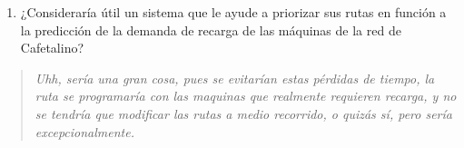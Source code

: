 \begin{enumerate}
\def\labelenumi{\arabic{enumi}.}
\setcounter{enumi}{4}
\item
  ¿Consideraría útil un sistema que le ayude a priorizar sus rutas en función a la predicción de la demanda de recarga de las máquinas de la red de Cafetalino?
\end{enumerate}

\begin{quote}
\emph{Uhh, sería una gran cosa, pues se evitarían estas pérdidas de tiempo, la ruta se programaría con las maquinas que realmente requieren recarga, y no se tendría que modificar las rutas a medio recorrido, o quizás sí, pero sería excepcionalmente.}
\end{quote}
